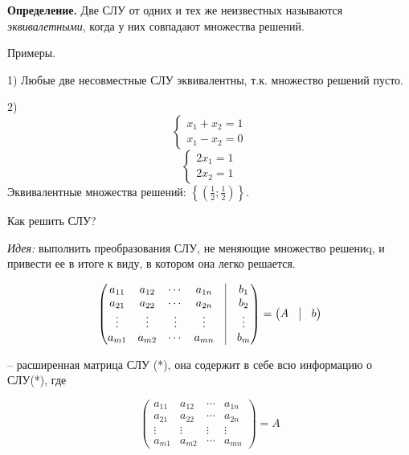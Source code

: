 \bigskip
\textbf{Определение.} Две СЛУ от одних и тех же неизвестных называются \textit{эквивалетными}, когда у них совпадают множества решений.

\bigskip
Примеры.

1) Любые две несовместные СЛУ эквивалентны, т.к. множество решений пусто.

2) 
\begin{equation*}
	\left\{
		\begin{aligned}
        x_1 + x_2 = 1 \\
        x_1 - x_2 = 0
		\end{aligned}
	\right. 
\end{equation*}
\begin{equation*}
    \left\{
		\begin{aligned}
        2x_1 = 1 \\
        2x_2 = 1
		\end{aligned}
	\right.
\end{equation*}
Эквивалентные множества решений: $ \left\{ \left( \frac{1}{2} ; \frac{1}{2} \right) \right\}$.

\bigskip
Как решить СЛУ?

\textit{Идея:} выполнить преобразования СЛУ, не меняющие множество решениq, и привести ее в итоге к виду, в котором она легко решается.

\begin{equation*}
	\begin{pmatrix}
		a_{11} & a_{12} & \cdots & a_{1n} & \vrule & b_1 \\
		a_{21} & a_{22} & \cdots & a_{2n} & \vrule & b_2 \\
       \vdots & \vdots & \vdots& \vdots & \vrule & \vdots\\ 
       a_{m1} & a_{m2} & \cdots & a_{mn} & \vrule & b_m
	\end{pmatrix}
    =
    \begin{pmatrix}
    	A & \vrule & b
	\end{pmatrix}
\end{equation*}

-- расширенная матрица СЛУ (*), она содержит в себе всю информацию о СЛУ(*), где 

\begin{equation*}
	\begin{pmatrix}
		a_{11} & a_{12} & \cdots & a_{1n} \\
		a_{21} & a_{22} & \cdots & a_{2n} \\
       \vdots & \vdots & \vdots& \vdots \\ 
       a_{m1} & a_{m2} & \cdots & a_{mn}
	\end{pmatrix}
    = A
\end{equation*}


